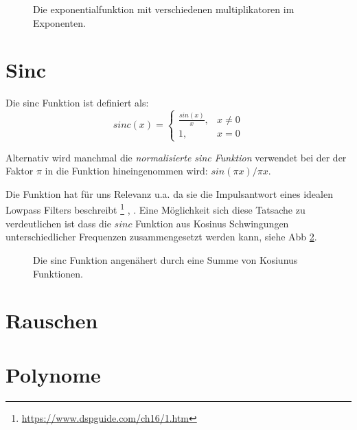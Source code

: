 \begin{figure}[H]
	\centering
	
	\caption{Die exponentialfunktion mit verschiedenen multiplikatoren im Exponenten.}
	\label{fig:expVersions}
\end{figure}



\section{Sinc}

Die sinc Funktion ist definiert als:
\begin{equation}
 sinc (x)={\begin{cases} \frac{sin(x)}{x} ,&x\neq 0\\{1},&x=0\end{cases}}
\end{equation}

Alternativ wird manchmal die \emph{normalisierte sinc Funktion} verwendet bei der der Faktor $\pi$ in die Funktion hineingenommen wird: $sin(\pi x) / \pi x$.

Die Funktion hat für uns Relevanz u.a. da sie die Impulsantwort eines idealen Lowpass Filters beschreibt \citep{smith1997scientist}\footnote{\href{https://www.dspguide.com/ch16/1.htm}{https://www.dspguide.com/ch16/1.htm}} , \citep{enwiki:sincFilter}. Eine Möglichkeit sich diese Tatsache zu verdeutlichen ist dass die $sinc$ Funktion aus Kosinus Schwingungen unterschiedlicher Frequenzen zusammengesetzt werden kann, siehe Abb \ref{fig:sincAsSum}. 



\begin{figure}[H]
	\centering
	
	\caption{Die sinc Funktion angenähert durch eine Summe von Kosiunus Funktionen.}
	\label{fig:sincAsSum}
\end{figure}

\section{Rauschen}
\section{Polynome}


